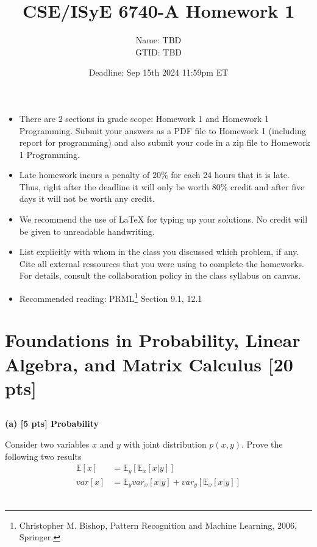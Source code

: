 \documentclass[twoside,10pt]{article}
\begin{document}
\title{CSE/ISyE 6740-A Homework 1}
\author{
Name: TBD \\
GTID: TBD
}
\date{Deadline: Sep 15th 2024 11:59pm ET}
\maketitle

\begin{itemize}
  \item There are 2 sections in grade scope: Homework 1 and Homework 1 Programming. Submit your answers as a PDF file to Homework 1 (including report for  programming) and also submit your code in a zip file to Homework 1 Programming. 
  \item Late homework incurs a penalty of 20\% for each 24 hours that it is late. Thus, right after the deadline it will only be worth 80\% credit and after five days it will not be worth any credit.
  \item We recommend the use of LaTeX for typing up your solutions. No credit will be given to unreadable handwriting.
  \item List explicitly with whom in the class you discussed which problem, if any. Cite all external ressources that you were using to complete the homeworks. For details, consult the collaboration policy in the class syllabus on canvas.
  \item Recommended reading: PRML\footnote{Christopher M. Bishop, Pattern Recognition and Machine
Learning, 2006, Springer.} Section 9.1, 12.1
\end{itemize}

\section{Foundations in Probability, Linear Algebra, and Matrix Calculus [20 pts]}

\subsection*{}
\noindent\textbf{(a) [5 pts] Probability}

Consider two variables $x$ and $y$ with joint distribution $p(x, y)$. Prove the following two results
\begin{align}
    \mathbb{E}[x] &= \mathbb{E}_y [\mathbb{E}_x [x|y]]\,\\
    var[x] &= \mathbb{E}_y var_x [x|y] + var_y  [\mathbb{E}_x [x|y]] 
\end{align} \\
\end{document}
